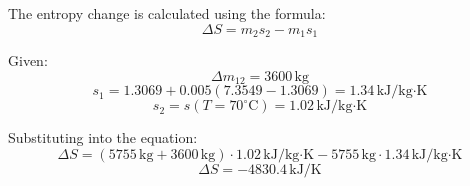 The entropy change is calculated using the formula:  
\[
\Delta S = m_2 s_2 - m_1 s_1
\]  

Given:  
\[
\Delta m_{12} = 3600 \, \text{kg}
\]  
\[
s_1 = 1.3069 + 0.005 (7.3549 - 1.3069) = 1.34 \, \text{kJ/kg·K}
\]  
\[
s_2 = s(T=70^\circ\text{C}) = 1.02 \, \text{kJ/kg·K}
\]  

Substituting into the equation:  
\[
\Delta S = (5755 \, \text{kg} + 3600 \, \text{kg}) \cdot 1.02 \, \text{kJ/kg·K} - 5755 \, \text{kg} \cdot 1.34 \, \text{kJ/kg·K}
\]  
\[
\Delta S = -4830.4 \, \text{kJ/K}
\]